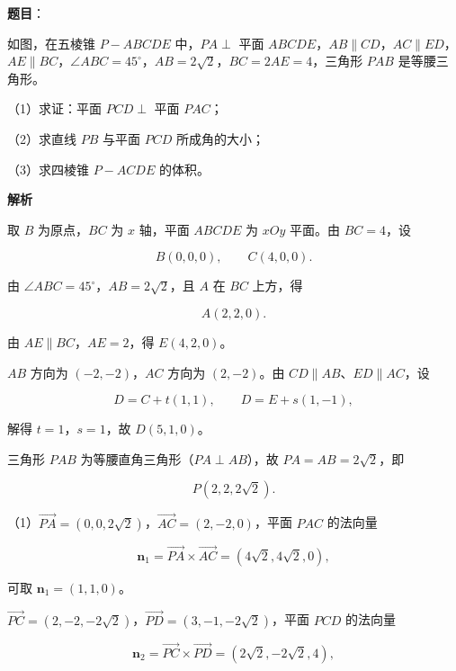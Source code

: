 \begin{answer}

\textbf{题目}：

如图，在五棱锥 $P-ABCDE$ 中，$PA\perp$ 平面 $ABCDE$，$AB\parallel CD$，$AC\parallel ED$，$AE\parallel BC$，$\angle ABC=45^\circ$，$AB=2\sqrt2$，$BC=2AE=4$，三角形 $PAB$ 是等腰三角形。

（1）求证：平面 $PCD\perp$ 平面 $PAC$；

（2）求直线 $PB$ 与平面 $PCD$ 所成角的大小；

（3）求四棱锥 $P-ACDE$ 的体积。
\nopagebreak[4]
\begin{center}\end{center}
\nopagebreak[4]
\textbf{解析}

取 $B$ 为原点，$BC$ 为 $x$ 轴，平面 $ABCDE$ 为 $xOy$ 平面。由 $BC=4$，设

\nopagebreak[4]
\[B(0,0,0),\qquad C(4,0,0).\]

由 $\angle ABC=45^\circ$，$AB=2\sqrt2$，且 $A$ 在 $BC$ 上方，得

\nopagebreak[4]
\[A(2,2,0).\]

由 $AE\parallel BC$，$AE=2$，得 $E(4,2,0)$。

$AB$ 方向为 $(-2,-2)$，$AC$ 方向为 $(2,-2)$。由 $CD\parallel AB$、$ED\parallel AC$，设

\nopagebreak[4]
\[D=C+t(1,1),\qquad D=E+s(1,-1),\]

解得 $t=1$，$s=1$，故 $D(5,1,0)$。

三角形 $PAB$ 为等腰直角三角形（$PA\perp AB$），故 $PA=AB=2\sqrt2$，即

\nopagebreak[4]
\[P(2,2,2\sqrt2).\]

（1）$\overrightarrow{PA}=(0,0,2\sqrt2)$，$\overrightarrow{AC}=(2,-2,0)$，平面 $PAC$ 的法向量

\nopagebreak[4]
\[\boldsymbol n_1=\overrightarrow{PA}\times\overrightarrow{AC}=(4\sqrt2,4\sqrt2,0),\]

可取 $\boldsymbol n_1=(1,1,0)$。

$\overrightarrow{PC}=(2,-2,-2\sqrt2)$，$\overrightarrow{PD}=(3,-1,-2\sqrt2)$，平面 $PCD$ 的法向量

\nopagebreak[4]
\[\boldsymbol n_2=\overrightarrow{PC}\times\overrightarrow{PD}
=(2\sqrt2,-2\sqrt2,4),\]


\end{answer}
